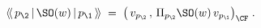 \begin{equation}
\langle\!\langle \, p_\2\,|\,\SO(w)
\,|\,p_\1 \,\rangle\!\rangle\;=\;\bigl( \,v_{p_\2}\, , \,
\Pi_{{p_\2}}\SO(w)\,v_{p_\1}\big)_{\CF}\;.
\end{equation}

